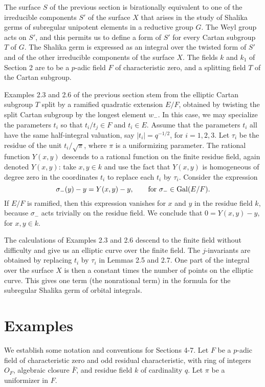 \documentclass{amsart}
\begin{document}
The surface $S$ of the previous section is birationally equivalent
to one of the irreducible components $S'$
of the surface $X$ that
arises in the study of Shalika germs of subregular unipotent elements
in a reductive group $G$.  The Weyl group acts on $S'$, and this permits
us to define a form of $S'$ for every Cartan subgroup $T$ of $G$.
The Shalika germ is expressed as an integral over the twisted form
of $S'$ and of the other irreducible components of the surface $X$.
The fields $k$ and $k_1$ of Section 2 are to be a $p$-adic field $F$
of characteristic zero, and a splitting field $T$ of the Cartan subgroup.

Examples 2.3 and 2.6 of the previous section stem from the elliptic
Cartan subgroup $T$ split by a ramified quadratic extension $E/F$,
obtained by twisting the split Cartan subgroup by the longest element
$w_-$.  In this case, we may specialize the parameters $t_i$ so that
$t_i/t_j\in F$ and $t_i\in E$.
Assume that the parameters $t_i$ all have the
same half-integral valuation, say $|t_i| = q^{-1/2}$, for $i=1,2,3$.
Let $\tau_i$ be the residue of the unit $t_i/\sqrt{\pi}$, where
$\pi$ is a uniformizing parameter.
The rational function $Y(x,y)$ descends to a rational
function on the finite residue field, again denoted
$Y(x,y)$: take $x,y\in k$ and use the fact that
$Y(x,y)$ is homogeneous of degree zero in the coordinates
$t_i$ to replace each $t_i$ by $\tau_i$.
  Consider the expression
$$\sigma_{-}(y) - y = Y(x,y) - y,\qquad\hbox{for } \sigma_{-}\in \operatorname{Gal}(E/F).$$
If $E/F$ is ramified, then this expression vanishes
for $x$ and $y$ in the residue field $k$, because
$\sigma_{-}$ acts trivially on the
residue field. We conclude that 
$0 = Y(x,y)-y$,
for $x,y\in k$.

The calculations of Examples 2.3 and
2.6 descend to the finite field without difficulty and give us an
elliptic curve over the finite field.  
The $j$-invariants are obtained by replacing $t_i$ by
$\tau_i$ in Lemmas 2.5 and 2.7.
One part of
the integral over the surface $X$ 
is then a constant times the number
of points on the elliptic curve.  This gives one term
(the nonrational term) in the formula
for the subregular Shalika germ of orbital integrals. 

\section{Examples}

We establish some notation and conventions for Sections
4-7.  Let $F$ be a $p$-adic field of characteristic
zero and odd residual characteristic, with ring
of integers $O_F$, algebraic closure $\bar F$, and
residue field $k$ of cardinality $q$.  Let $\pi$ be
a uniformizer in $F$. 
\end{document}
